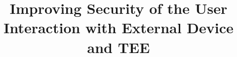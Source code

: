 

\graphicspath{{images/}}

\title[]{Improving Security of the User Interaction with External Device and TEE} 



\maketitle
\thispagestyle{empty}











